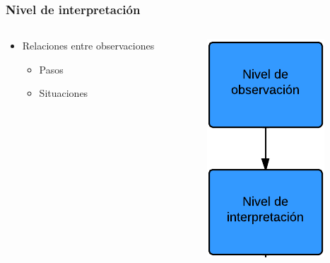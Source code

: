 \begin{frame}
	\frametitle{Nivel de interpretaci\'on}
	
	\begin{columns}[T] %
		\begin{column}[T]{5cm} %
			\begin{itemize}
				\item Relaciones entre observaciones
				\begin{itemize}
					\item Pasos
					\item Situaciones
				\end{itemize}
			\end{itemize}
		\end{column}
		\begin{column}[T]{5cm} %
			\includegraphics[width=0.5\linewidth]{./Figures/NivelDeInterpretacion.png}
		\end{column}
	\end{columns}
\end{frame}